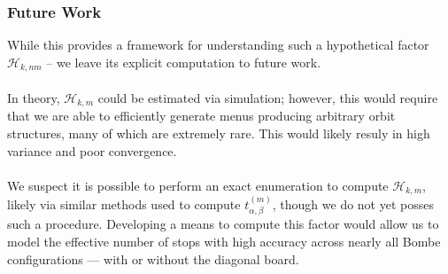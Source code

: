 \subsubsection{Future Work} While this provides a framework for understanding such a hypothetical factor $\mathcal{H}_{k,nm}$ -- we leave its explicit computation to future work. 
\\\\In theory, $\mathcal{H}_{k,m}$ could be estimated via simulation; however, this would require that we are able to efficiently generate menus producing arbitrary orbit structures, many of which are extremely rare. This would likely resuly in high variance and poor convergence. 
\\\\We suspect it is possible to perform an exact enumeration to compute $\mathcal{H}_{k,m}$, likely via similar methods used to compute $t^{(m)}_{\alpha,\beta}$, though we do not yet posses such a procedure. Developing a means to compute this factor would allow us to model the effective number of stops with high accuracy across nearly all Bombe configurations — with or without the diagonal board.

